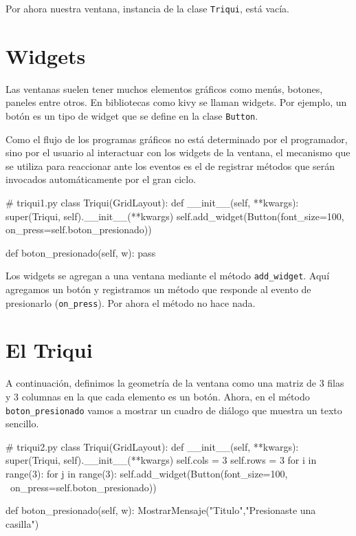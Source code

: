 Por ahora nuestra ventana, instancia de la clase \texttt{Triqui},
está vacía.

\section{Widgets}

Las ventanas suelen tener muchos elementos gráficos como menús, botones,
paneles entre otros. En bibliotecas como kivy se llaman widgets. Por
ejemplo, un botón es un tipo de widget que se define en la clase \texttt{Button}.

Como el flujo de los programas gráficos no está determinado por el
programador, sino por el usuario al interactuar con los widgets de
la ventana, el mecanismo que se utiliza para reaccionar ante los eventos
es el de registrar métodos que serán invocados automáticamente por
el gran ciclo.

\begin{pythoncode}
# triqui1.py
class Triqui(GridLayout):
    def __init__(self, **kwargs):
        super(Triqui, self).__init__(**kwargs)
        self.add_widget(Button(font_size=100, 
                        on_press=self.boton_presionado))
    
    def boton_presionado(self, w):
        pass
\end{pythoncode}

Los widgets se agregan a una ventana mediante el método \texttt{add\_widget}.
Aquí agregamos un botón y registramos un método que responde al evento
de presionarlo (\texttt{on\_press}). Por ahora el método no hace nada.

\section{El Triqui}

A continuación, definimos la geometría de la ventana como una matriz
de 3 filas y 3 columnas en la que cada elemento es un botón. Ahora,
en el método \texttt{boton\_presionado} vamos a mostrar un cuadro
de diálogo que muestra un texto sencillo.

\begin{pythoncode}
# triqui2.py
class Triqui(GridLayout):
    def __init__(self, **kwargs):
        super(Triqui, self).__init__(**kwargs)
        self.cols = 3
        self.rows = 3
        for i in range(3):
            for j in range(3):
                self.add_widget(Button(font_size=100, \
                                on_press=self.boton_presionado))
        
    def boton_presionado(self, w):
        MostrarMensaje("Titulo","Presionaste una casilla")
\end{pythoncode}

